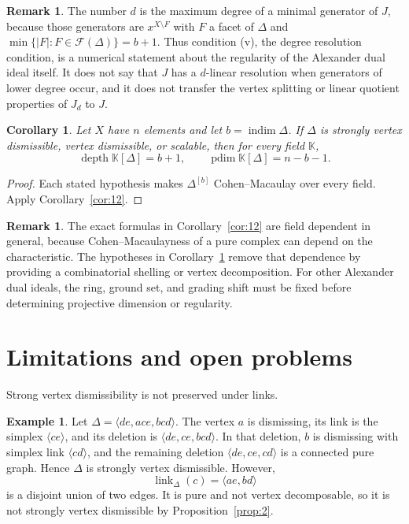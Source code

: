 \documentclass[11pt]{amsart}
\newcommand{\K}{\mathbb K}
\newcommand{\F}{\mathcal F}
\DeclareMathOperator{\indim}{indim}
\DeclareMathOperator{\link}{link}
\DeclareMathOperator{\depth}{depth}
\DeclareMathOperator{\pdim}{pdim}
\newtheorem{corollary}[theorem]{Corollary}
\theoremstyle{definition}
\newtheorem{example}[theorem]{Example}
\newtheorem{remark}[theorem]{Remark}
\begin{document}
	\begin{remark}
		The number $d$ is the maximum degree of a minimal generator of $J$, because those generators are $x^{X\setminus F}$ with $F$ a facet of $\Delta$ and $\min\{|F|:F\in\F(\Delta)\}=b+1$.  Thus condition (v), the degree resolution condition, is a numerical statement about the regularity of the Alexander dual ideal itself.  It does not say that $J$ has a $d$-linear resolution when generators of lower degree occur, and it does not transfer the vertex splitting or linear quotient properties of $J_d$ to $J$.
	\end{remark}
	
	\begin{corollary}\label{cor:13}
		Let $X$ have $n$ elements and let $b=\indim\Delta$.  If $\Delta$ is strongly vertex dismissible, vertex dismissible, or scalable, then for every field $\K$,
		\[
		\depth\K[\Delta]=b+1,
		\qquad
		\pdim\K[\Delta]=n-b-1.
		\]
	\end{corollary}
	
	\begin{proof}
		Each stated hypothesis makes $\Delta^{[b]}$ Cohen--Macaulay over every field. Apply Corollary~\ref{cor:12}.
	\end{proof}
	
	\begin{remark}\label{rem:6}
		The exact formulas in Corollary~\ref{cor:12} are field dependent in general, because Cohen--Macaulayness of a pure complex can depend on the characteristic.  The hypotheses in Corollary~\ref{cor:13} remove that dependence by providing a combinatorial shelling or vertex decomposition. For other Alexander dual ideals, the ring, ground set, and grading shift must be fixed before determining projective dimension or regularity.
	\end{remark}
	
	\section{Limitations and open problems}\label{sec:8}
	
	Strong vertex dismissibility is not preserved under links.
	
	\begin{example}\label{ex:5}
		Let $\Delta=\langle de,ace,bcd\rangle$. The vertex $a$ is dismissing, its link is the simplex $\langle ce\rangle$, and its deletion is $\langle de,ce,bcd\rangle$. In that deletion, $b$ is dismissing with simplex link $\langle cd\rangle$, and the remaining deletion $\langle de,ce,cd\rangle$ is a connected pure graph. Hence $\Delta$ is strongly vertex dismissible. However,
		\[
		\link_\Delta(c)=\langle ae,bd\rangle
		\]
		is a disjoint union of two edges. It is pure and not vertex decomposable, so it is not strongly vertex dismissible by Proposition~\ref{prop:2}.
	\end{example}
	
\end{document}
